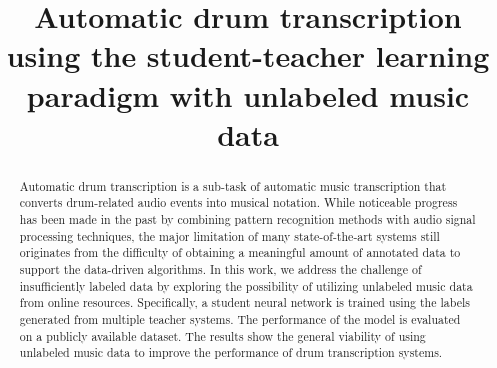 \documentclass{article}
\title{Automatic drum transcription using the student-teacher learning paradigm with unlabeled music data}
\begin{document}
%
\maketitle
%
\begin{abstract}
Automatic drum transcription is a sub-task of automatic music transcription that converts drum-related audio events into musical notation. While noticeable progress has been made in the past by combining pattern recognition methods with audio signal processing techniques, the major limitation of many state-of-the-art systems still originates from the difficulty of obtaining a meaningful amount of annotated data to support the data-driven algorithms. In this work, we address the challenge of insufficiently labeled data by exploring the possibility of utilizing unlabeled music data from online resources. Specifically, a student neural network is trained using the labels generated from multiple teacher systems. The performance of the model is evaluated on a publicly available dataset. The results show the general viability of using unlabeled music data to improve the performance of drum transcription systems. 
\end{abstract}
%
\end{document}
